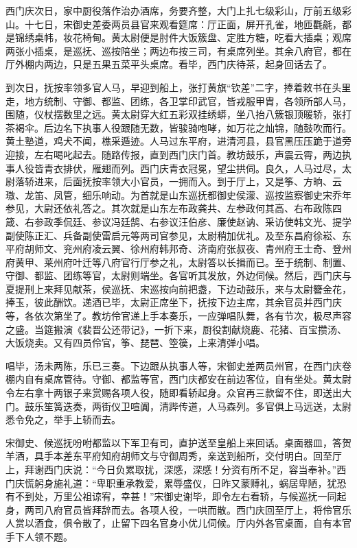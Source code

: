 西门庆次日，家中厨役落作治办酒席，务要齐整，大门上扎七级彩山，厅前五级彩山。十七日，宋御史差委两员县官来观看筵席：厅正面，屏开孔雀，地匝氍毹，都是锦绣桌帏，妆花椅甸。黄太尉便是肘件大饭簇盘、定胜方糖，吃看大插桌；观席两张小插桌，是巡抚、巡按陪坐；两边布按三司，有桌席列坐。其余八府官，都在厅外棚内两边，只是五果五菜平头桌席。看毕，西门庆待茶，起身回话去了。

到次日，抚按率领多官人马，早迎到船上，张打黄旗“钦差”二字，捧着敕书在头里走，地方统制、守御、都监、团练，各卫掌印武官，皆戎服甲胄，各领所部人马，围随，仪杖摆数里之远。黄太尉穿大红五彩双挂绣蟒，坐八抬八簇银顶暖轿，张打茶褐伞。后边名下执事人役跟随无数，皆骏骑咆哮，如万花之灿锦，随鼓吹而行。黄土塾道，鸡犬不闻，樵采遁迹。人马过东平府，进清河县，县官黑压压跪于道旁迎接，左右喝叱起去。随路传报，直到西门庆门首。教坊鼓乐，声震云霄，两边执事人役皆青衣排伏，雁翅而列。西门庆青衣冠冕，望尘拱伺。良久，人马过尽，太尉落轿进来，后面抚按率领大小官员，一拥而入。到于厅上，又是筝、方晌、云璈、龙笛、凤管，细乐响动。为首就是山东巡抚都御史侯濛、巡按监察御史宋乔年参见，大尉还依礼答之。其次就是山东左布政龚共、左参政何其高、右布政陈四箴、右参政季侃廷、参议冯廷鹄、右参议汪伯彦、廉使赵讷、采访使韩文光、提学副使陈正汇、兵备副使雷启元等两司官参见，太尉稍加优礼。及至东昌府徐崧、东平府胡师文、兖州府凌云翼、徐州府韩邦奇、济南府张叔夜、青州府王士奇、登州府黄甲、莱州府叶迁等八府官行厅参之礼，太尉答以长揖而已。至于统制、制置、守御、都监、团练等官，太尉则端坐。各官听其发放，外边伺候。然后，西门庆与夏提刑上来拜见献茶，侯巡抚、宋巡按向前把盏，下边动鼓乐，来与太尉簪金花，捧玉，彼此酬饮。递酒已毕，太尉正席坐下，抚按下边主席，其余官员并西门庆等，各依次第坐了。教坊伶官递上手本奏乐，一应弹唱队舞，各有节次，极尽声容之盛。当筵搬演《裴晋公还带记》，一折下来，厨役割献烧鹿、花猪、百宝攒汤、大饭烧卖。又有四员伶官，筝、琵琶、箜篌，上来清弹小唱。

唱毕，汤未两陈，乐已三奏。下边跟从执事人等，宋御史差两员州官，在西门庆卷棚内自有桌席管待。守御、都监等官，西门庆都安在前边客位，自有坐处。黄太尉令左右拿十两银子来赏赐各项人役，随即看轿起身。众官再三款留不住，即送出大门。鼓乐笙簧迭奏，两街仪卫喧阗，清跸传道，人马森列。多官俱上马远送，太尉悉令免之，举手上轿而去。

宋御史、候巡抚吩咐都监以下军卫有司，直护送至皇船上来回话。桌面器皿，答贺羊酒，具手本差东平府知府胡师文与守御周秀，亲送到船所，交付明白。回至厅上，拜谢西门庆说：“今日负累取扰，深感，深感！分资有所不足，容当奉补。”西门庆慌躬身施礼道：“卑职重承教爱，累辱盛仪，日昨又蒙赙礼，蜗居卑陋，犹恐有不到处，万里公祖谅宥，幸甚！”宋御史谢毕，即令左右看轿，与候巡抚一同起身，两司八府官员皆拜辞而去。各项人役，一哄而散。西门庆回至厅上，将伶官乐人赏以酒食，俱令散了，止留下四名官身小优儿伺候。厅内外各官桌面，自有本官手下人领不题。


